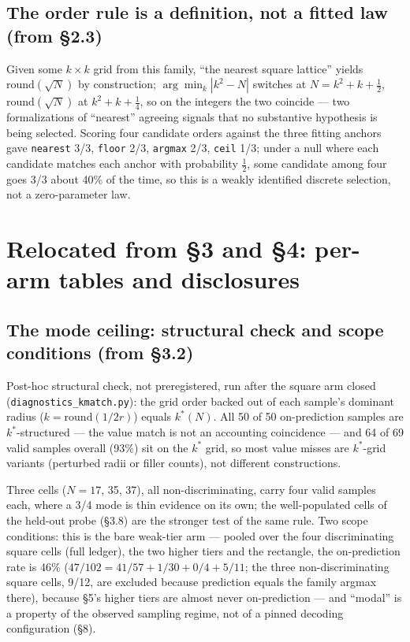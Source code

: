 \subsection{The order rule is a definition, not a fitted law (from \S2.3)}

Given some $k \times k$ grid from this family, ``the nearest
square lattice'' yields $\mathrm{round}(\sqrt{N})$ by construction; $\arg\min_k |k^2 - N|$ switches at
$N = k^2 + k + \tfrac{1}{2}$, $\mathrm{round}(\sqrt{N})$ at $k^2 + k + \tfrac{1}{4}$, so on the integers the two coincide
--- two formalizations of ``nearest'' agreeing signals that no substantive hypothesis
is being selected. Scoring four candidate orders against the three fitting anchors gave
\texttt{nearest} 3/3, \texttt{floor} 2/3, \texttt{argmax} 2/3, \texttt{ceil} 1/3; under a null where each candidate matches
each anchor with probability $\tfrac{1}{2}$, some candidate among four goes 3/3 about 40\% of the time, so
this is a weakly identified discrete selection, not a zero-parameter law.

\section{Relocated from \S3 and \S4: per-arm tables and disclosures}

\subsection{The mode ceiling: structural check and scope conditions (from \S3.2)}

Post-hoc structural check, not preregistered, run after the square arm closed
(\texttt{diagnostics\_kmatch.py}): the grid order backed out of each sample's dominant radius
($k = \mathrm{round}(1/2r)$) equals $k^*(N)$. All 50 of 50 on-prediction samples are $k^*$-structured --- the
value match is not an accounting coincidence --- and 64 of 69 valid samples overall (93\%) sit on
the $k^*$ grid, so most value misses are $k^*$-grid variants (perturbed radii or filler counts), not
different constructions.

Three cells ($N = 17$, 35, 37), all non-discriminating, carry four valid samples each, where a 3/4
mode is thin evidence on its own; the well-populated cells of the held-out probe (\S3.8) are the
stronger test of the same rule. Two scope conditions: this is the bare weak-tier arm --- pooled
over the four discriminating square cells (full ledger), the two higher tiers and the rectangle,
the on-prediction rate is 46\% ($47/102 = 41/57 + 1/30 + 0/4 + 5/11$; the three non-discriminating
square cells, 9/12, are excluded because prediction equals the family argmax there), because \S5's
higher tiers are almost never on-prediction --- and ``modal'' is a property of the observed
sampling regime, not of a pinned decoding configuration (\S8).

